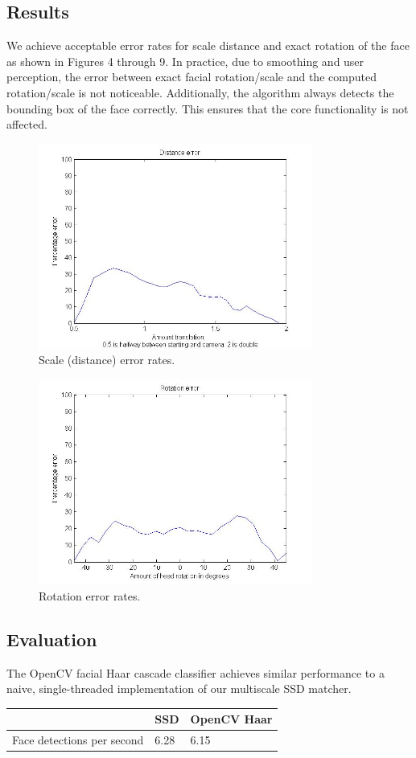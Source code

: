 \documentclass[10pt,twocolumn,letterpaper]{article}
\begin{document}
\subsection*{Results}
We achieve acceptable error rates for scale distance and exact rotation of the face as shown in Figures 4 through 9. In practice, due to smoothing and user perception, the error between exact facial rotation/scale and the computed rotation/scale is not noticeable. Additionally, the algorithm always detects the bounding box of the face correctly. This ensures that the core functionality is not affected.

\begin{figure}[ht!]
\centering
\includegraphics[width=90mm]{distance_error.jpg}
\caption{Scale (distance) error rates.\label{overflow}}
\end{figure}
\begin{figure}[ht!]
\centering
\includegraphics[width=90mm]{rotation_error.jpg}
\caption{Rotation error rates.\label{overflow}}
\end{figure}

\subsection*{Evaluation}
The OpenCV facial Haar cascade classifier achieves similar performance to a naive, single-threaded implementation of our multiscale SSD matcher.
\begin{center}
    \begin{tabular}{| l | l | l |}
    \hline
    \         & \textbf{SSD} & \textbf{OpenCV Haar} \\ \hline
    Face detections per second & 6.28 & 6.15 \\  \hline
    \end{tabular}
\end{center}
\end{document}
